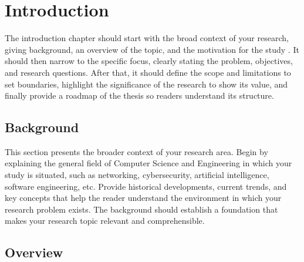 %

\chapter{Introduction}
\label{ch:introduction}

The introduction chapter should start with the broad context of your research, giving background, an overview of the topic, and the motivation for the study \cite{leicester2023}. It should then narrow to the specific focus, clearly stating the problem, objectives, and research questions. After that, it should define the scope and limitations to set boundaries, highlight the significance of the research to show its value, and finally provide a roadmap of the thesis so readers understand its structure.

\section{Background}
\label{sec:background}

This section presents the broader context of your research area. Begin by explaining the general field of Computer Science and Engineering in which your study is situated, such as networking, cybersecurity, artificial intelligence, software engineering, etc. Provide historical developments, current trends, and key concepts that help the reader understand the environment in which your research problem exists. The background should establish a foundation that makes your research topic relevant and comprehensible.

\section{Overview}
\label{sec:overview}

